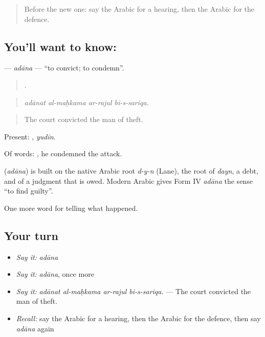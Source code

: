 \label{lesson:AR-C334-adana}



\begin{quote}
Before the new one: say the Arabic for a hearing, then the Arabic for the defence.
\end{quote}

\subsection*{You'll want to know: }
\textbf{} — \emph{adāna} — \textquotedblleft{}to convict; to condemn\textquotedblright{}.

\begin{quote}
   .
\end{quote}

\begin{quote}
\emph{adānat al-maḥkama ar-rajul bi-s-sariqa.}
\end{quote}

\begin{quote}
The court convicted the man of theft.
\end{quote}

Present: , \emph{yudīn}.

Of words:  , he condemned the attack.

\begin{cousinweb}
\textbf{} (\emph{adāna}) is built on the native Arabic root \emph{d-y-n} (Lane), the root of \emph{dayn}, a debt, and of a judgment that is owed. Modern Arabic gives Form IV \emph{adāna} the sense \textquotedblleft{}to find guilty\textquotedblright{}.
\end{cousinweb}

\begin{grammarlens}[title={What you've built}]
One more word for telling what happened.
\end{grammarlens}

\subsection*{Your turn}
\begin{itemize}
\raggedright
  \item \emph{Say it:} \emph{adāna}
  \item \emph{Say it:} \emph{adāna}, once more
  \item \emph{Say it:} \emph{adānat al-maḥkama ar-rajul bi-s-sariqa.} — The court convicted the man of theft.
  \item \emph{Recall:} say the Arabic for a hearing, then the Arabic for the defence, then say \emph{adāna} again
\end{itemize}

